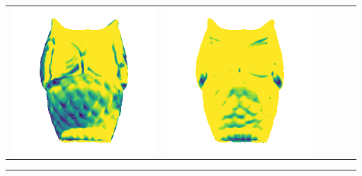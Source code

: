 \begin{tabularx}{\linewidth}{@{}Y@{}Y@{}Y@{}Y@{}Y@{}Y@{}}
\includegraphics[width=\linewidth]{semisynthetic/20150514_15_marrnet_err.png} &
\includegraphics[width=\linewidth]{semisynthetic/20150514_15_ef_err.png} \\
\end{tabularx}
\begin{center}\rule{0.5\linewidth}{\linethickness}\end{center}

